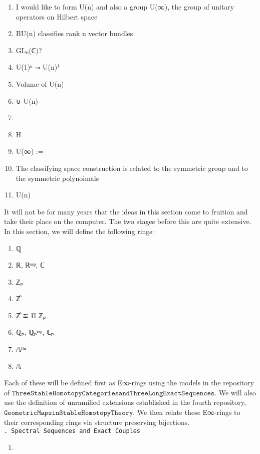 \documentclass{book}
\newcounter{pcounter}
\newcounter{sectioncount}
\newcounter{subsectioncount}
\renewcommand{\subsection}[1]{\texttt{\thesubsectioncount . #1} \stepcounter{subsectioncount}}
\begin{document}
\begin{enumerate}
\item I would like to form U(n) and also a group U(∞), the group of unitary operators on Hilbert space
\item BU(n) classifies rank n vector bundles
\item GLₙ(ℂ)?
\item U(1)ⁿ ⭢ U(n)¹
\item Volume of U(n)
\item ∪ U(n)
\item 
\item H
\item U(∞) := 
\item The classifying space construction is related to the symmetric group and to the symmetric polynoimals
\item U(n)
\end{enumerate}

It will not be for many years that the ideas in this section come to fruition and take their place on the computer. The two stages before this are quite extensive.\\

In this section, we will define the following rings:
\begin{enumerate}
\item ℚ
\item ℝ, ℝˢᵉᵖ, ℂ
\item ℤₚ
\item ℤ̂
\item ℤ̂ ≅ Π ℤₚ
\item ℚₚ, ℚₚˢᵉᵖ, ℂₚ
\item 𝔸ᶠⁱⁿ
\item 𝔸
\end{enumerate}

Each of these will be defined first as E∞-rings using the models in the repository of  $\texttt{ThreeStableHomotopyCategoriesandThreeLongExactSequences}$. We will also use the definition of unramified extensions established in the fourth repository,  $\texttt{GeometricMapsinStableHomotopyTheory}$. We then relate these E∞-rings to their corresponding rings via structure preserving bijections.\\



\subsection{Spectral Sequences and Exact Couples}

\begin{enumerate}
\item 
\end{enumerate}
\end{document}
